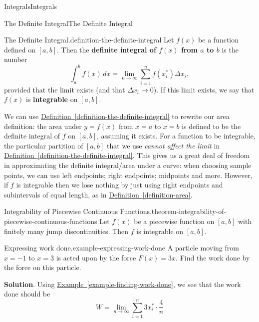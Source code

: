 \documentclass[10pt,]{book}
\newcommand{\terminology}[1]{\textbf{#1}}
\numberwithin{equation}{section}
\begin{document}
\begin{chapterptx}{Integrals}{}{Integrals}{}{}
\begin{sectionptx}{The Definite Integral}{}{The Definite Integral}{}{}
\begin{definition}{The Definite Integral.}{definition-the-definite-integral}%
\hypertarget{p-427}{}%
Let \(f(x)\) be a function defined on \([a,b]\). Then the \terminology{definite integral of \(f(x)\) from \(a\) to \(b\)} is the number%
\begin{equation*}
\int_{a}^{b}f(x)\,dx = \lim_{n\to\infty}\sum_{i=1}^{n}f(x_{i}^{*})\Delta x_{i},
\end{equation*}
provided that the limit exists (and that \(\Delta x_{i}\to0\)). If this limit exists, we say that \(f(x)\) is \terminology{integrable} on \([a,b]\).%
\end{definition}
\hypertarget{p-428}{}%
We can use \hyperref[definition-the-definite-integral]{Definition~\ref{definition-the-definite-integral}} to rewrite our area definition: the area under \(y=f(x)\) from \(x=a\) to \(x=b\) is defined to be the definite integral of \(f\) on \([a,b]\), assuming it exists. For a function to be integrable, the particular partition of \([a,b]\) that we use \emph{cannot affect the limit} in \hyperref[definition-the-definite-integral]{Definition~\ref{definition-the-definite-integral}}. This gives us a great deal of freedom in approximating the definite integral/area under a curve: when choosing sample points, we can use left endpoints; right endpoints; midpoints and more. However, if \(f\) is integrable then we lose nothing by just using right endpoints and subintervals of equal length, as in \hyperref[definition-area]{Definition~\ref{definition-area}}.%
\begin{theorem}{Integrability of Piecewise Continuous Functions.}{}{theorem-integrability-of-piecewise-continuous-functions}%
\hypertarget{p-429}{}%
Let \(f(x)\) be a piecewise function on \([a,b]\) with finitely many jump discontinuities. Then \(f\) is integrable on \([a,b]\).%
\end{theorem}
\begin{example}{Expressing work done.}{example-expressing-work-done}%
\hypertarget{p-430}{}%
A particle moving from \(x=-1\) to \(x=3\) is acted upon by the force \(F(x) = 3x\). Find the work done by the force on this particle.%
\par\smallskip%
\noindent\textbf{Solution}.\hypertarget{solution-94}{}\quad%
\hypertarget{p-431}{}%
Using \hyperref[example-finding-work-done]{Example~\ref{example-finding-work-done}}, we see that the work done should be%
\begin{equation*}
W = \lim_{n\to\infty}\sum_{i=1}^{n}3x_{i}^{*}\cdot\frac{4}{n}
\end{equation*}

\end{example}
\end{sectionptx}
\end{chapterptx}
\end{document}
